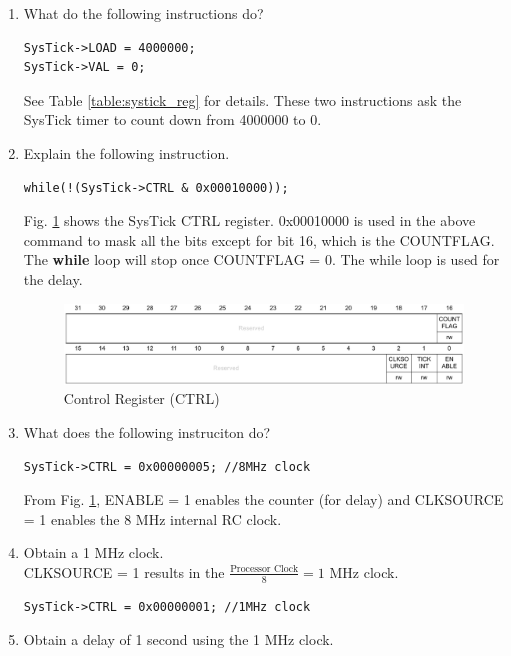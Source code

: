 \documentclass[journal,12pt,twocolumn]{IEEEtran}
\renewcommand\thesection{\arabic{section}}
\renewcommand\thesubsection{\thesection.\arabic{subsection}}
\begin{document}
\begin{enumerate}[label=\thesubsection.\arabic*.,ref=\thesubsection.\theenumi]
\begin{table}[!ht]
\footnotesize
\centering

\caption{Systick Registers}
\label{table:systick_reg}
\end{table}
\item What do the following instructions do?
\begin{lstlisting}
SysTick->LOAD = 4000000;
SysTick->VAL = 0;
\end{lstlisting}
\solution See Table \ref{table:systick_reg} for details.  These two instructions ask the SysTick timer to count down from 4000000 to 0.  
\item Explain the following instruction.
\begin{lstlisting}
while(!(SysTick->CTRL & 0x00010000));
\end{lstlisting}
\solution Fig. \ref{fig:systick_ctrl} shows the SysTick CTRL register.    0x00010000 is used in the above command to mask all the bits except for bit 16, which
is the COUNTFLAG.  The \textbf{while} loop will stop once COUNTFLAG = 0. The while loop is used for the delay.
\begin{figure}[!ht]
\begin{center}
\includegraphics[width=\columnwidth]{./stm32/timers/figs/systick_ctrl.eps}
\end{center}
\caption{Control Register (CTRL)}
\label{fig:systick_ctrl}
\end{figure}
\item What does the following instruciton do?
\begin{lstlisting}
SysTick->CTRL = 0x00000005;	//8MHz clock
\end{lstlisting}
\solution From Fig. \ref{fig:systick_ctrl}, ENABLE = 1 enables the counter (for delay) and CLKSOURCE = 1 enables the 8 MHz internal RC clock.
\item Obtain a 1 MHz clock. 
\\
\solution CLKSOURCE = 1 results in the $\frac{\text{Processor Clock}}{8} = 1$ MHz clock.
\begin{lstlisting}
SysTick->CTRL = 0x00000001;	//1MHz clock
\end{lstlisting}
\item Obtain a delay of 1 second using the 1 MHz clock.

\end{enumerate}
\end{document}
